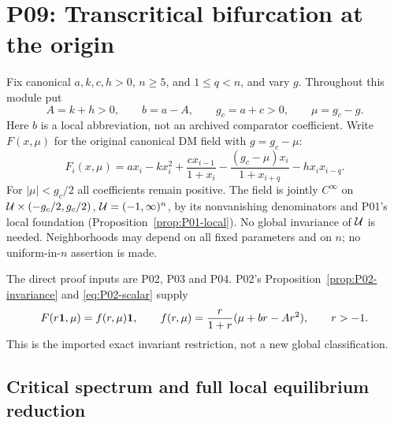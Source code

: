 \section{P09: Transcritical bifurcation at the origin}
\label{sec:P09}

Fix canonical $a,k,c,h>0$, $n\ge5$, and $1\le q<n$, and vary $g$.
Throughout this module put
\begin{equation}
 A=k+h>0,\qquad b=a-A,\qquad g_c=a+c>0,\qquad \mu=g_c-g.
 \label{eq:P09-parameters}
\end{equation}
Here $b$ is a local abbreviation, not an archived comparator coefficient.
Write $F(x,\mu)$ for the original canonical DM field with $g=g_c-\mu$:
\begin{equation}
 F_i(x,\mu)=a x_i-kx_i^2+\frac{c x_{i-1}}{1+x_i}
 -\frac{(g_c-\mu)x_i}{1+x_{i+q}}-h x_i x_{i-q}.
 \label{eq:P09-field}
\end{equation}
For $|\mu|<g_c/2$ all coefficients remain positive. The field is jointly
$C^\infty$ on $\mathcal{U}\times(-g_c/2,g_c/2)$,
$\mathcal{U}=(-1,\infty)^n$, by its nonvanishing denominators and P01's
local foundation (Proposition~\ref{prop:P01-local}). No global invariance
of $\mathcal{U}$ is needed. Neighborhoods may depend on all fixed parameters
and on $n$; no uniform-in-$n$ assertion is made.

The direct proof inputs are P02, P03 and P04. P02's
Proposition~\ref{prop:P02-invariance} and \eqref{eq:P02-scalar} supply
\begin{equation}
 F(r\mathbf{1},\mu)=f(r,\mu)\mathbf{1},\qquad
 f(r,\mu)=\frac{r}{1+r}(\mu+br-Ar^2),\qquad r>-1.
 \label{eq:P09-scalar}
\end{equation}
This is the imported exact invariant restriction, not a new global
classification.

\subsection{Critical spectrum and full local equilibrium reduction}
\label{slot:P09-1}

